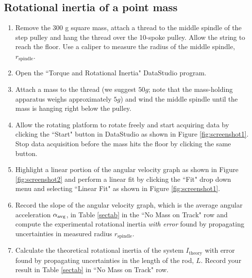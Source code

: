 \subsection{Rotational inertia of a point mass}
\label{pointmass}
\begin{enumerate}
	\item Remove the 300 g square mass, attach a thread to the middle spindle of the step pulley and hang the thread over the 10-spoke pulley.  Allow the string to reach the floor.  Use a caliper to measure the radius of the middle spindle, $r_\text{spindle}$.
	\item Open the ``Torque and Rotational Inertia" DataStudio program.
	\item Attach a mass to the thread (we suggest $50g$; note that the mass-holding apparatus weighs approximately $5g$) and wind the middle spindle until the mass is hanging right below the pulley.
	\item Allow the rotating platform to rotate freely and start acquiring data by clicking the ``Start" button in DataStudio as shown in Figure \ref{fig:screenshot1}. Stop data acquisition before the mass hits the floor by clicking the same button.
	\item Highlight a linear portion of the angular velocity graph as shown in Figure \ref{fig:screenshot2} and perform a linear fit by clicking the ``Fit" drop down menu and selecting ``Linear Fit" as shown in Figure \ref{fig:screenshot1}.
	\item Record the slope of the angular velocity graph, which is the average angular acceleration $\alpha _{\rm avg}$, in Table \ref{sectab} in the ``No Mass on Track" row and compute the experimental rotational inertia {\it{with error}} found by propagating uncertainties in measured radius $r_\text{spindle}$.
\item Calculate the theoretical rotational inertia of the system $I_\text{theory}$ with error found by propagating uncertainties in the length of the rod, $L$. Record your result in Table \ref{sectab} in ``No Mass on Track" row. \myskip


\end{enumerate}
